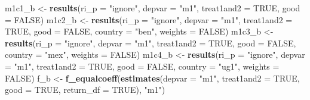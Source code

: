 \documentclass[]{article}
\newenvironment{Shaded}{\begin{snugshade}}{\end{snugshade}}
\newcommand{\KeywordTok}[1]{\textcolor[rgb]{0.13,0.29,0.53}{\textbf{#1}}}
\newcommand{\DataTypeTok}[1]{\textcolor[rgb]{0.13,0.29,0.53}{#1}}
\newcommand{\StringTok}[1]{\textcolor[rgb]{0.31,0.60,0.02}{#1}}
\newcommand{\OtherTok}[1]{\textcolor[rgb]{0.56,0.35,0.01}{#1}}
\newcommand{\NormalTok}[1]{#1}
\begin{document}
\begin{Shaded}
\begin{Highlighting}[]
\NormalTok{m1c1_b <-}\StringTok{ }\KeywordTok{results}\NormalTok{(}\DataTypeTok{ri_p =} \StringTok{"ignore"}\NormalTok{, }\DataTypeTok{depvar =} \StringTok{"m1"}\NormalTok{, }\DataTypeTok{treat1and2 =} \OtherTok{TRUE}\NormalTok{, }\DataTypeTok{good =} \OtherTok{FALSE}\NormalTok{)}
\NormalTok{m1c2_b <-}\StringTok{ }\KeywordTok{results}\NormalTok{(}\DataTypeTok{ri_p =} \StringTok{"ignore"}\NormalTok{, }\DataTypeTok{depvar =} \StringTok{"m1"}\NormalTok{, }\DataTypeTok{treat1and2 =} \OtherTok{TRUE}\NormalTok{, }\DataTypeTok{good =} \OtherTok{FALSE}\NormalTok{, }
                  \DataTypeTok{country =} \StringTok{"ben"}\NormalTok{, }\DataTypeTok{weights =} \OtherTok{FALSE}\NormalTok{)}
\NormalTok{m1c3_b <-}\StringTok{ }\KeywordTok{results}\NormalTok{(}\DataTypeTok{ri_p =} \StringTok{"ignore"}\NormalTok{, }\DataTypeTok{depvar =} \StringTok{"m1"}\NormalTok{, }\DataTypeTok{treat1and2 =} \OtherTok{TRUE}\NormalTok{, }\DataTypeTok{good =} \OtherTok{FALSE}\NormalTok{, }
                  \DataTypeTok{country =} \StringTok{"mex"}\NormalTok{, }\DataTypeTok{weights =} \OtherTok{FALSE}\NormalTok{)}
\NormalTok{m1c4_b <-}\StringTok{ }\KeywordTok{results}\NormalTok{(}\DataTypeTok{ri_p =} \StringTok{"ignore"}\NormalTok{, }\DataTypeTok{depvar =} \StringTok{"m1"}\NormalTok{, }\DataTypeTok{treat1and2 =} \OtherTok{TRUE}\NormalTok{, }\DataTypeTok{good =} \OtherTok{FALSE}\NormalTok{, }
                  \DataTypeTok{country =} \StringTok{"ug1"}\NormalTok{, }\DataTypeTok{weights =} \OtherTok{FALSE}\NormalTok{)}
\NormalTok{f_b <-}\StringTok{ }\KeywordTok{f_equalcoeff}\NormalTok{(}\KeywordTok{estimates}\NormalTok{(}\DataTypeTok{depvar =} \StringTok{"m1"}\NormalTok{, }\DataTypeTok{treat1and2 =} \OtherTok{TRUE}\NormalTok{, }\DataTypeTok{good =} \OtherTok{TRUE}\NormalTok{, }\DataTypeTok{return_df =} \OtherTok{TRUE}\NormalTok{), }\StringTok{"m1"}\NormalTok{)}
\end{Highlighting}
\end{Shaded}
\end{document}

